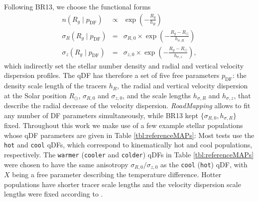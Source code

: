 \documentclass[iop,revtex4,numberedappendix,appendixfloats]{emulateapj}
\newcommand{\RM}{{\sl RoadMapping}}
\begin{document}
Following BR13, we choose the functional forms
\begin{eqnarray}
n(R_g \mid p_\text{DF}) &\propto& \exp\left(-\frac{R_g}{h_R} \right)\\
\sigma_R(R_g \mid p_\text{DF}) &=& \sigma_{R,0} \times \exp\left(- \frac{R_g-R_\odot}{h_{\sigma,R}} \right)\label{eq:sigmaRRg}\\
\sigma_z(R_g \mid p_\text{DF}) &=& \sigma_{z,0} \times \exp\left(- \frac{R_g-R_\odot}{h_{\sigma,z}} \right)\label{eq:sigmazRg},
\end{eqnarray}
which indirectly set the stellar number density and radial and vertical velocity dispersion profiles. The qDF has therefore a set of five free parameters $p_\text{DF}$: the density scale length of the tracers $h_R$, the radial and vertical velocity dispersion at the Solar position $R_\odot$, $\sigma_{R,0}$ and $\sigma_{z,0}$, and the scale lengths $h_{\sigma,R}$ and $h_{\sigma,z}$, that describe the radial decrease of the velocity dispersion. \RM{} allows to fit any number of DF parameters simultaneously, while BR13 kept $\{\sigma_{R,0},h_{\sigma,R}\}$ fixed. Throughout this work we make use of a few example stellar populations whose qDF parameters are given in Table \ref{tbl:referenceMAPs}: Most tests use the \texttt{hot} and \texttt{cool} qDFs, which correspond to kinematically hot and cool populations, respectively. The \texttt{warmer} (\texttt{cooler} and \texttt{colder}) qDFs in Table \ref{tbl:referenceMAPs} were chosen to have the same anisotropy $\sigma_{R,0}/\sigma_{z,0}$ as the \texttt{cool} (\texttt{hot}) qDF, with $X$ being a free parameter describing the temperature difference. Hotter populations have shorter tracer scale lengths \citep{2012ApJ...753..148B} and the velocity dispersion scale lengths were fixed according to \citet{2012ApJ...755..115B}.
\end{document}
